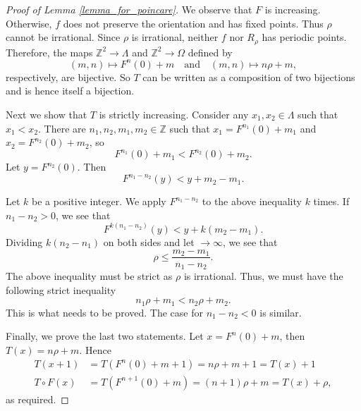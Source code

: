 \documentclass[12pt]{article}
\theoremstyle{definition}
\theoremstyle{remark}
\begin{document}
\begin{proof}[Proof of Lemma \ref{lemma_for_poincare}]
We observe that $F$ is increasing. Otherwise, $f$ does not preserve the orientation and has fixed points. Thus $\rho$ cannot be irrational. Since $\rho$ is irrational, neither $f$ nor $R_\rho$ has periodic points. Therefore, the maps 
$\mathbb Z^2 \to \Lambda$ and $\mathbb Z^2 \to \Omega$ defined by
\[
(m,n) \mapsto F^n(0) +m \quad \text{and} \quad (m,n) \mapsto n\rho +m,
\]
respectively, are bijective. So $T$ can be written as a composition of two bijections and is hence itself a bijection.

Next we show that $T$ is strictly increasing. Consider any $x_1, x_2 \in \Lambda$ such that 
$x_1 <x_2$.
There are $n_1,n_2,m_1,m_2 \in \mathbb Z$ such that
$x_1 = F^{n_1}(0)+m_1$ and $x_2 = F^{n_2}(0)+m_2$, so
\[
F^{n_1}(0)+m_1 <  F^{n_2}(0)+m_2.
\]
Let $y = F^{n_2}(0)$. Then
\[
F^{n_1-n_2}(y) < y +m_2-m_1.
\]

Let $k$ be a positive integer. We apply $F^{n_1-n_2}$ to the above inequality $k$ times. If $n_1-n_2>0$, we see that
\[
F^{k(n_1-n_2)}(y)<y+k(m_2-m_1).
\]
Dividing $k(n_2-n_1)$ on both sides and let $\to\infty$, we see that
\[
\rho\leq \frac{m_2-m_1}{n_1-n_2}.
\]
The above inequality must be strict as $\rho$ is irrational. Thus, we must have the following strict inequality
\[
n_1\rho+m_1<n_2\rho+m_2.
\]
This is what needs to be proved. The case for $n_1-n_2<0$ is similar.

Finally, we prove the last two statements. Let $x=F^n(0)+m$, then $T(x) = n\rho +m$.
Hence
\begin{align*}
T(x+1) &= T(F^n(0)+m+1) = n\rho +m+1 = T(x)+1 \\
T \circ F(x) &= T(F^{n+1}(0)+m) = (n+1)\rho +m = T(x)+\rho,
\end{align*}
as required.
\end{proof}
\end{document}
